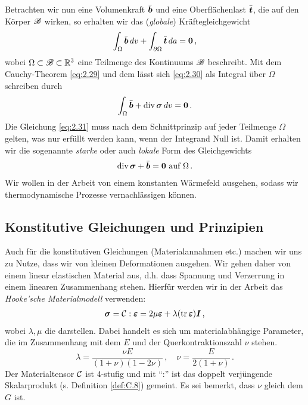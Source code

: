 Betrachten wir nun eine Volumenkraft $\bar{\boldsymbol b}$ und eine Oberflächenlast $\bar{\boldsymbol t}$, die auf den Körper $\mathscr B$ wirken, so erhalten wir das (\textit{globale}) Kräftegleichgewicht
\begin{align}\label{eq:2.30}
	\int_{\Omega} \bar{\boldsymbol b} \, dv + \int_{\partial \Omega} \bar{\boldsymbol t} \, da = \boldsymbol 0 \, ,
\end{align}
wobei $\Omega \subset \mathscr B \subset \mathbb{R}^3$ eine Teilmenge des Kontinuums $\mathscr B$ beschreibt. Mit dem Cauchy-Theorem \eqref{eq:2.29} und dem  lässt sich \eqref{eq:2.30} als Integral über $\Omega$ schreiben durch
\begin{align}\label{eq:2.31}
	\int_{\Omega} \bar{\boldsymbol b} + \operatorname{div} \boldsymbol\sigma \, dv = \boldsymbol 0 \, .
\end{align}
Die Gleichung \eqref{eq:2.31} muss nach dem Schnittprinzip auf jeder Teilmenge $\Omega$ gelten, was nur erfüllt werden kann, wenn der Integrand Null ist. Damit erhalten wir die sogenannte \textit{starke} oder auch \textit{lokale} Form des Gleichgewichts
\begin{align}\label{eq:2.32}
	\operatorname{div} \boldsymbol \sigma + \bar{\boldsymbol b} = \boldsymbol 0 \text{ auf } \Omega \, .
\end{align}
Wir wollen in der Arbeit von einem konstanten Wärmefeld ausgehen, sodass wir thermodynamische Prozesse vernachlässigen können.

\subsection{Konstitutive Gleichungen und Prinzipien}
\label{kap:2.5.3}


Auch für die konstitutiven Gleichungen (Materialannahmen etc.) machen wir uns zu Nutze, dass wir von kleinen Deformationen ausgehen. Wir gehen daher von einem linear elastischen Material aus, d.h. dass Spannung und Verzerrung in einem linearen Zusammenhang stehen. Hierfür werden wir in der Arbeit das \textit{Hooke'sche Materialmodell} verwenden:
\begin{align}\label{eq:2.33}
	\boldsymbol \sigma = \mathcal C :\boldsymbol {\varepsilon} = 2 \mu \boldsymbol {\varepsilon} + \lambda (\operatorname{tr} \boldsymbol {\varepsilon}) \boldsymbol I \, ,
\end{align}
wobei $\lambda, \mu$ die \textit{} darstellen. Dabei handelt es sich um materialabhängige Parameter, die im Zusammenhang mit dem  $E$ und der Querkontraktionszahl $\nu$ stehen.
\[
	\lambda = \frac{\nu E}{(1+\nu)(1-2\nu)} \, ,\quad \nu = \frac E{2(1+\nu)} \, .
\]
Der Materialtensor $\mathcal C$ ist 4-stufig und mit "`:"' ist das doppelt verjüngende Skalarprodukt (s. Definition \ref{def:C.8}) gemeint. Es sei bemerkt, dass $\nu$ gleich dem  $G$ ist.


